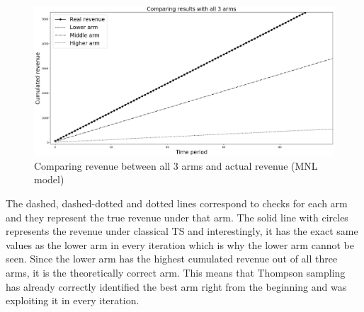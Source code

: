 \documentclass[a4paper]{article}
\begin{document}
\begin{figure}[h]
	\centering
	\includegraphics[width=1.03\textwidth]{Figure_1-2.png}
	\caption{\label{fig:one}Comparing revenue between all 3 arms and actual revenue (MNL model)}
\end{figure}
The dashed, dashed-dotted and dotted lines correspond to checks for each arm and they represent the true revenue under that arm. The solid line with circles represents the revenue under classical TS and interestingly, it has the exact same values as the lower arm in every iteration which is why the lower arm cannot be seen. Since the lower arm has the highest cumulated revenue out of all three arms, it is the theoretically correct arm. This means that Thompson sampling has already correctly identified the best arm right from the beginning and was exploiting it in every iteration.
\end{document}
